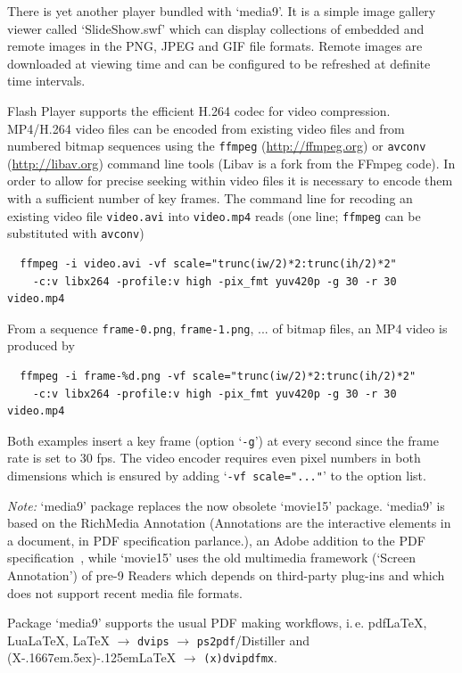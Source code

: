 \documentclass[a4paper]{article}
\def\pXepLaTeX{(X\kern-.1667em\lower.5ex\hbox{\reflectbox{E}})\kern-.125em\LaTeX}
\begin{document}
There is yet another player bundled with `media9'. It is a simple image gallery viewer called `SlideShow.swf' which can display collections of embedded and remote images in the PNG, JPEG and GIF file formats. Remote images are downloaded at viewing time and can be configured to be refreshed at definite time intervals.

Flash Player supports the efficient H.264 codec for video compression. MP4/H.264 video files can be encoded from existing video files and from numbered bitmap sequences using the \verb+ffmpeg+ (\url{http://ffmpeg.org}) or \verb+avconv+ (\url{http://libav.org}) command line tools (Libav is a fork from the FFmpeg code). In order to allow for precise seeking within video files it is necessary to encode them with a sufficient number of key frames. The command line for recoding an existing video file \verb+video.avi+ into \verb+video.mp4+ reads (one line; \verb+ffmpeg+ can be substituted with \verb+avconv+)
\begin{center}
\begin{Verbatim}
  ffmpeg -i video.avi -vf scale="trunc(iw/2)*2:trunc(ih/2)*2"
    -c:v libx264 -profile:v high -pix_fmt yuv420p -g 30 -r 30 video.mp4
\end{Verbatim}
\end{center}
From a sequence \verb+frame-0.png+, \verb+frame-1.png+, ... of bitmap files, an MP4 video is produced by
\begin{Verbatim}
  ffmpeg -i frame-%d.png -vf scale="trunc(iw/2)*2:trunc(ih/2)*2"
    -c:v libx264 -profile:v high -pix_fmt yuv420p -g 30 -r 30 video.mp4
\end{Verbatim}
Both examples insert a key frame (option `\verb+-g+') at every second since the frame rate is set to 30 fps. The video encoder requires even pixel numbers in both dimensions which is ensured by adding `\verb+-vf scale="..."+' to the option list.

\emph{Note:} `media9' package replaces the now obsolete `movie15' package. `media9' is based on the RichMedia Annotation (Annotations are the interactive elements in a document, in PDF specification parlance.), an Adobe addition to the PDF specification~\cite{supplement}, while `movie15' uses the old multimedia framework (`Screen Annotation') of pre-9 Readers which depends on third-party plug-ins and which does not support recent media file formats.

Package `media9' supports the usual PDF making workflows, i.\,e. pdf\LaTeX{}, Lua\LaTeX, \LaTeX{} $\rightarrow$ \verb+dvips+ $\rightarrow$ \verb+ps2pdf+/Distiller and \pXepLaTeX{} $\rightarrow$ \verb+(x)dvipdfmx+.
\end{document}
